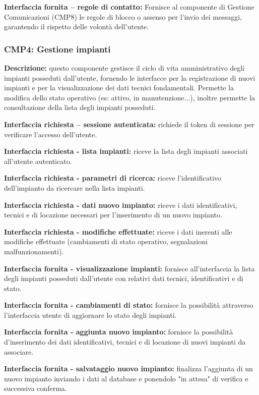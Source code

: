 \textbf{Interfaccia fornita – regole di contatto:}
Fornisce al componente di Gestione Comunicazioni (CMP8) le regole di blocco o assenso per
l'invio dei messaggi, garantendo il rispetto delle volontà dell'utente.

\subsubsection*{CMP4: Gestione impianti}

\textbf{Descrizione: }questo componente gestisce il ciclo di vita amministrativo degli impianti
posseduti dall'utente, fornendo le interfacce per la registrazione di nuovi impianti e per la
visualizzazione dei dati tecnici fondamentali. Permette la modifica dello stato operativo (es: attivo, in manutenzione...),
inoltre permette la consultazione della lista degli impianti posseduti.

\textbf{Interfaccia richiesta – sessione autenticata:}
richiede il token di sessione per verificare l'accesso dell'utente.

\textbf{Interfaccia richiesta - lista impianti:}
riceve la lista degli impianti associati all'utente autenticato.

\textbf{Interfaccia richiesta - parametri di ricerca:}
riceve l'identificativo dell'impianto da ricercare nella lista impianti.

\textbf{Interfaccia richiesta - dati nuovo impianto:}
riceve i dati identificativi, tecnici e di locazione necessari per l'inserimento di un nuovo impianto.

\textbf{Interfaccia richiesta - modifiche effettuate:}
riceve i dati inerenti alle modifiche effettuate (cambiamenti di stato operativo, segnalazioni malfunzionamenti).

\textbf{Interfaccia fornita - visualizzazione impianti:}
fornisce all'interfaccia la lista degli impianti posseduti dall'utente con relativi dati tecnici, identificativi e di stato.

\textbf{Interfaccia fornita - cambiamenti di stato:}
fornisce la possibilità attraverso l'interfaccia utente di aggiornare lo stato degli impianti.

\textbf{Interfaccia fornita - aggiunta nuovo impianto:}
fornisce la possibilità d'inserimento dei dati identificativi, tecnici e di locazione di nuovi impianti da associare.

\textbf{Interfaccia fornita - salvataggio nuovo impianto:}
finalizza l'aggiunta di un nuovo impianto inviando i dati al database e ponendolo "in attesa" di verifica e successiva conferma.

